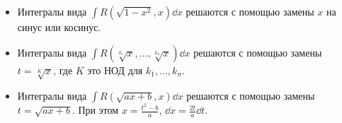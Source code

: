 \begin{itemize}
\item Интегралы вида \(\int R(\sqrt{1 - x^2}, x) \dd x\) решаются с помощью
замены \(x\) на синус или косинус.

\item Интегралы вида \(\int R(\sqrt[k_{1}]{x}, \dots, \sqrt[k_{n}]{x}) \dd x\)
решаются с помощью замены \(t = \sqrt[K]{x}\), где \(K\) это НОД для
\(k_{1}, \dotsc, k_{n}\).

\item Интегралы вида \(\int R(\sqrt{ax + b}, x) \dd x\) решаются с помощью
замены \(t = \sqrt{ax + b}\). При этом \(x = \frac{t^2 - b}{a}\),
\(\dd x = \frac{2t}{a} \dd t\).
\end{itemize}
